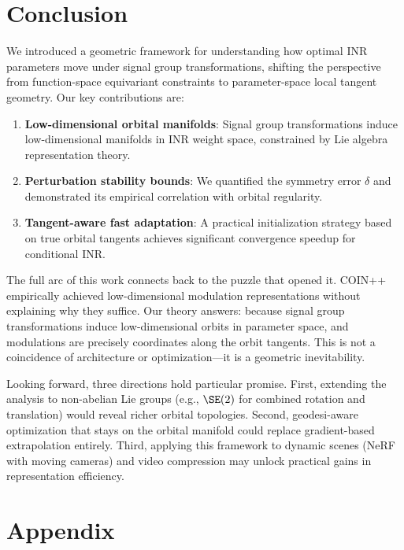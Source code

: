 \section{Conclusion}
\label{sec:conclusion}

We introduced a geometric framework for understanding how optimal INR parameters move under signal group transformations, shifting the perspective from function-space equivariant constraints to parameter-space local tangent geometry.
Our key contributions are:

\begin{enumerate}
    \item \textbf{Low-dimensional orbital manifolds}: Signal group transformations induce low-dimensional manifolds in INR weight space, constrained by Lie algebra representation theory.
    \item \textbf{Perturbation stability bounds}: We quantified the symmetry error $\delta$ and demonstrated its empirical correlation with orbital regularity.
    \item \textbf{Tangent-aware fast adaptation}: A practical initialization strategy based on true orbital tangents achieves significant convergence speedup for conditional INR.
\end{enumerate}

The full arc of this work connects back to the puzzle that opened it.
COIN++ empirically achieved low-dimensional modulation representations without explaining why they suffice.
Our theory answers: because signal group transformations induce low-dimensional orbits in parameter space, and modulations are precisely coordinates along the orbit tangents.
This is not a coincidence of architecture or optimization---it is a geometric inevitability.

Looking forward, three directions hold particular promise.
First, extending the analysis to non-abelian Lie groups (e.g., $\SE(2)$ for combined rotation and translation) would reveal richer orbital topologies.
Second, geodesi-aware optimization that stays on the orbital manifold could replace gradient-based extrapolation entirely.
Third, applying this framework to dynamic scenes (NeRF with moving cameras) and video compression may unlock practical gains in representation efficiency.

\appendix

\section*{Appendix}
\label{sec:appendix}




